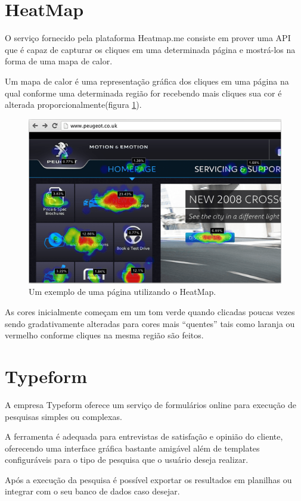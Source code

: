\section{HeatMap}
\par O serviço fornecido pela plataforma Heatmap.me consiste em prover uma API que é capaz de capturar os cliques em uma determinada página e mostrá-los na forma de uma mapa de calor.
\par Um mapa de calor é uma representação gráfica dos cliques em uma página na qual conforme uma determinada região for recebendo mais cliques sua cor é alterada proporcionalmente(figura \ref{fig:heatmap_explanation}).
\begin{figure}[htb]
\centering
\includegraphics[width=15cm]{figuras/heatmap_explanation}
\caption{\label{fig:heatmap_explanation} Um exemplo de uma página utilizando o HeatMap.}
\end{figure}
\par As cores inicialmente começam em um tom verde quando clicadas poucas vezes sendo gradativamente alteradas para cores mais ``quentes'' tais como laranja ou vermelho conforme cliques na mesma região são feitos.

\section{Typeform}
\par A empresa Typeform oferece um serviço de formulários online para execução de pesquisas simples ou complexas.
\par A ferramenta é adequada para entrevistas de satisfação e opinião do cliente, oferecendo uma interface gráfica bastante amigável além de templates configuráveis para o tipo de pesquisa que o usuário deseja realizar.
\par Após a execução da pesquisa é possível exportar os resultados em planilhas ou integrar com o seu banco de dados caso desejar.
